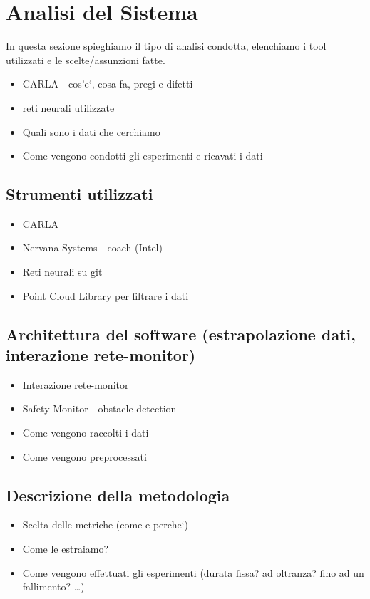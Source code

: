 \chapter{Analisi del Sistema}

In questa sezione spieghiamo il tipo di analisi condotta, elenchiamo i tool utilizzati e le scelte/assunzioni fatte.\newline

\begin{itemize}
	\item CARLA - cos'e`, cosa fa, pregi e difetti
	\item reti neurali utilizzate
	\item Quali sono i dati che cerchiamo
	\item Come vengono condotti gli esperimenti e ricavati i dati
\end{itemize}

\section{Strumenti utilizzati}

\begin{itemize}
	\item CARLA
	\item Nervana Systems - coach (Intel)
	\item Reti neurali su git
	\item Point Cloud Library per filtrare i dati
\end{itemize}

\section{Architettura del software (estrapolazione dati, interazione rete-monitor)}

\begin{itemize}
	
	\item Interazione rete-monitor
	\item Safety Monitor - obstacle detection
	\item Come vengono raccolti i dati
	\item Come vengono preprocessati
	
\end{itemize}

\section{Descrizione della metodologia}

\begin{itemize}

	\item Scelta delle metriche (come e perche`)
	\item Come le estraiamo?
	\item Come vengono effettuati gli esperimenti (durata fissa? ad oltranza? fino ad un fallimento? \dots)

\end{itemize}
